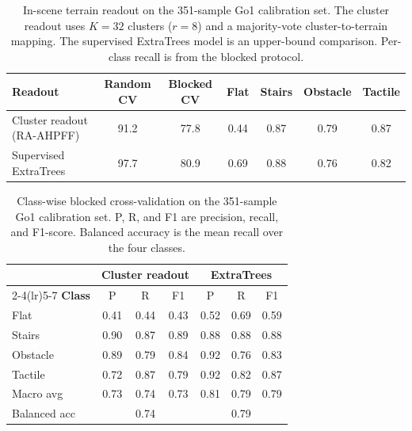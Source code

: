 \documentclass[final,3p,times]{elsarticle}
\begin{document}
\begin{table}[t]
    \centering
    \caption{In-scene terrain readout on the 351-sample Go1 calibration set. The cluster readout uses $K=32$ clusters ($r=8$) and a majority-vote cluster-to-terrain mapping. The supervised ExtraTrees model is an upper-bound comparison. Per-class recall is from the blocked protocol.}
    \label{tab:go1_cluster}
    \begin{tabular}{lcccccc}
        \toprule
        \textbf{Readout} & \textbf{Random CV} & \textbf{Blocked CV} & \textbf{Flat} & \textbf{Stairs} & \textbf{Obstacle} & \textbf{Tactile} \\
        \midrule
        Cluster readout (RA-AHPFF) & 91.2 & 77.8 & 0.44 & 0.87 & 0.79 & 0.87 \\
        Supervised ExtraTrees & 97.7 & 80.9 & 0.69 & 0.88 & 0.76 & 0.82 \\
        \bottomrule
    \end{tabular}
\end{table}

\begin{table}[t]
    \centering
    \caption{Class-wise blocked cross-validation on the 351-sample Go1 calibration set. P, R, and F1 are precision, recall, and F1-score. Balanced accuracy is the mean recall over the four classes.}
    \label{tab:go1_classwise}
    \begin{tabular}{lcccccc}
        \toprule
        & \multicolumn{3}{c}{\textbf{Cluster readout}} & \multicolumn{3}{c}{\textbf{ExtraTrees}} \\
        \cmidrule(lr){2-4}\cmidrule(lr){5-7}
        \textbf{Class} & P & R & F1 & P & R & F1 \\
        \midrule
        Flat & 0.41 & 0.44 & 0.43 & 0.52 & 0.69 & 0.59 \\
        Stairs & 0.90 & 0.87 & 0.89 & 0.88 & 0.88 & 0.88 \\
        Obstacle & 0.89 & 0.79 & 0.84 & 0.92 & 0.76 & 0.83 \\
        Tactile & 0.72 & 0.87 & 0.79 & 0.92 & 0.82 & 0.87 \\
        \midrule
        Macro avg & 0.73 & 0.74 & 0.73 & 0.81 & 0.79 & 0.79 \\
        Balanced acc & \multicolumn{3}{c}{0.74} & \multicolumn{3}{c}{0.79} \\
        \bottomrule
    \end{tabular}
\end{table}
\end{document}
